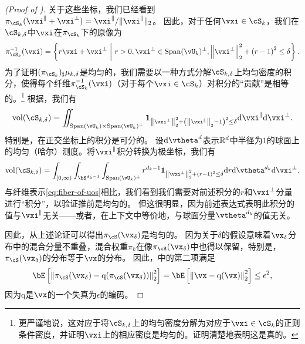 \documentclass[../../book-main_zh.tex]{subfiles}
\begin{document}
\begin{proof}[(Proof of )]
    关于这些坐标，我们已经看到$\pi_{\cS_k}(\vxi^\| + \vxi^\perp) = \vxi^\| / \norm{\vxi^{\|}}_2$。
    因此，对于任何$\vxi \in \cS_{k}$，我们在$\cS_{k, \delta}$中$\vxi$在$\pi_{\cS_k}$下的原像为
    \begin{equation}
        \pi_{\cS_k}^{-1}(\vxi) = \set*{
            r\vxi + \vxi^\perp 
            \given
            r > 0,
            \vxi^{\perp} \in \Span(\vU_k)^\perp,
            \norm*{\vxi^{\perp}}_2^2
            + \left( r - 1 \right)^2
            \leq
            \delta
        }.
        \label{eq:fiber-of-uos}
    \end{equation}
    为了证明$(\pi_{\cS_k})_{\sharp} \mu_{k, \delta}$是均匀的，我们需要以一种方式分解$\cS_{k, \delta}$上均匀密度的积分，使得每个纤维$\pi_{\cS_k}^{-1}(\vxi)$（对于每个$\vxi \in \cS_k$）对积分的“贡献”是相等的。\footnote{更严谨地说，这对应于将$\cS_{k, \delta}$上的均匀密度分解为对应于$\vxi \in \cS_{k}$的正则条件密度，并证明$\vxi$上的相应密度是均匀的。证明清楚地表明这是真的。}
    根据，我们有
    \begin{equation}
        \volume(\cS_{k, \delta})
        = \iint_{\Span(\vU_k) \times \Span(\vU_k)^\perp} \mathbf{1}_{
            \norm*{\vxi^{\perp}}_2^2
            + \left( \norm*{\vxi^{\|}}_2 - 1 \right)^2
            \leq
            \delta
        }
        \odif \vxi^{\|} \odif \vxi^{\perp}.
    \end{equation}
    特别是，在正交坐标上的积分是可分的。
    设$\odif \vtheta^{d}$表示$\mathbb{R}^d$中半径为$1$的球面上的均匀（哈尔）测度。将$\vxi^{\|}$积分转换为极坐标，我们有
    \begin{equation}
        \volume(\cS_{k, \delta})
        = \int_{[0, \infty)} \int_{\bS^{d_k-1}} \int_{\Span(\vU_k)^\perp} 
        r^{d_k-1}
        \mathbf{1}_{
            \norm*{\vxi^{\perp}}_2^2
            + \left( r - 1 \right)^2
            \leq
            \delta
        }
        \odif r \odif \vtheta^{d_k} \odif \vxi^{\perp}.
    \end{equation}
    与纤维表示\eqref{eq:fiber-of-uos}相比，我们看到我们需要对前述积分的$r$和$\vxi^\perp$分量进行“积分”，以验证推前是均匀的。
    但这很明显，因为前述表达式表明此积分的值与$\vxi^\|$无关——或者，在上下文中等价地，与球面分量$\vtheta^{d_k}$的值无关。

    因此，从上述论证可以得出$\pi_{\cS}(\vx_{\delta})$是均匀的。
    因为关于$\delta$的假设意味着$\vx_{\delta}$分布中的混合分量不重叠，混合权重$\pi_k$在像$\pi_{\cS}(\vx_{\delta})$中也得以保留，特别是，$\pi_{\cS}(\vx_{\delta})$的分布等于$\vx$的分布。
    因此，中的第二项满足
    \begin{equation}
        \bE\left[ \norm*{ \pi_{\cS}(\vx_{\delta}) - \mathrm{q}(\pi_{\cS}(\vx_{\delta})) }_2^2 \right]
        =
        \bE\left[ \norm*{ \vx - \mathrm{q}(\vx) }_2^2 \right]
        \leq
        \epsilon^2,
    \end{equation}
    因为$\mathrm{q}$是$\vx$的一个失真为$\epsilon$的编码。


\end{proof}
\end{document}
